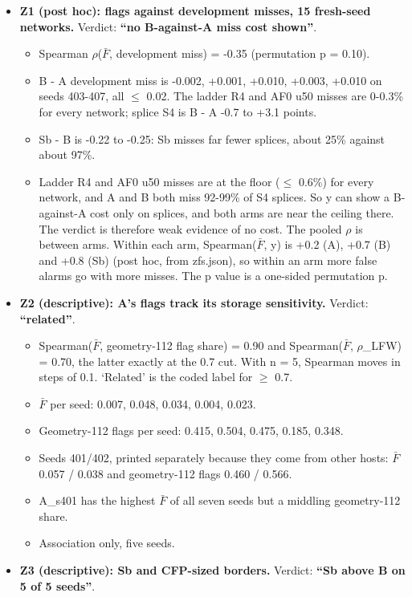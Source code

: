 \documentclass[10pt,twocolumn,letterpaper]{article}
\providecommand{\tightlist}{\setlength{\itemsep}{0pt}\setlength{\parskip}{0pt}}
\begin{document}
\begin{itemize}
\tightlist
\item
  \textbf{Z1 (post hoc): flags against development misses, 15 fresh-seed networks.} Verdict: \textbf{``no B-against-A miss cost shown''}.

  \begin{itemize}
  \tightlist
  \item
    Spearman \(\rho\)(\(\bar F\), development miss) = -0.35 (permutation p = 0.10).
  \item
    B - A development miss is -0.002, +0.001, +0.010, +0.003, +0.010 on seeds 403-407, all \(\le\) 0.02. The ladder R4 and AF0 u50 misses are 0-0.3\% for every network; splice S4 is B - A -0.7 to +3.1 points.
  \item
    Sb - B is -0.22 to -0.25: Sb misses far fewer splices, about 25\% against about 97\%.
  \item
    Ladder R4 and AF0 u50 misses are at the floor (\(\le\) 0.6\%) for every network, and A and B both miss 92-99\% of S4 splices. So y can show a B-against-A cost only on splices, and both arms are near the ceiling there. The verdict is therefore weak evidence of no cost. The pooled \(\rho\) is between arms. Within each arm, Spearman(\(\bar F\), y) is +0.2 (A), +0.7 (B) and +0.8 (Sb) (post hoc, from zfs.json), so within an arm more false alarms go with more misses. The p value is a one-sided permutation p.
  \end{itemize}
\item
  \textbf{Z2 (descriptive): A's flags track its storage sensitivity.} Verdict: \textbf{``related''}.

  \begin{itemize}
  \tightlist
  \item
    Spearman(\(\bar F\), geometry-112 flag share) = 0.90 and Spearman(\(\bar F\), \textbar{}\(\rho\)\_LFW\textbar) = 0.70, the latter exactly at the 0.7 cut. With n = 5, Spearman moves in steps of 0.1. `Related' is the coded label for \(\ge\) 0.7.
  \item
    \(\bar F\) per seed: 0.007, 0.048, 0.034, 0.004, 0.023.
  \item
    Geometry-112 flags per seed: 0.415, 0.504, 0.475, 0.185, 0.348.
  \item
    Seeds 401/402, printed separately because they come from other hosts: \(\bar F\) 0.057 / 0.038 and geometry-112 flags 0.460 / 0.566.
  \item
    A\_s401 has the highest \(\bar F\) of all seven seeds but a middling geometry-112 share.
  \item
    Association only, five seeds.
  \end{itemize}
\item
  \textbf{Z3 (descriptive): Sb and CFP-sized borders.} Verdict: \textbf{``Sb above B on 5 of 5 seeds''}.


\end{itemize}
\end{document}
